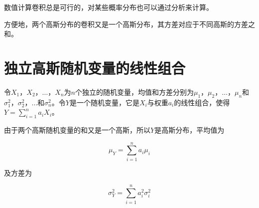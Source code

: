 数值计算卷积总是可行的，对某些概率分布也可以通过分析来计算。

方便地，两个高斯分布的卷积又是一个高斯分布，其方差对应于不同高斯的方差之和。


\section{独立高斯随机变量的线性组合}\label{sec:lcombrandom}
令$X_1$，$X_2$，$\ldots$，$X_n$为$n$个独立的随机变量，均值和方差分别为$\mu_1$，$\mu_2$，$\ldots$，$\mu_n$和$\sigma_1^2$，$\sigma_2^2$，$\ldots$和$\sigma^2_n$。令$Y$是一个随机变量，它是$X_i$与权重$a_i$的线性组合，使得$Y=\sum_{i=1}^na_iX_i$。


由于两个高斯随机变量的和又是一个高斯，所以$Y$是高斯分布，平均值为

\begin{equation}
\mu_Y=\sum_{i=1}^na_i\mu_i
\end{equation}

及方差为

\begin{equation}
\sigma_Y^2=\sum_{i=1}^na_i^2\sigma_i^2
\end{equation}  



